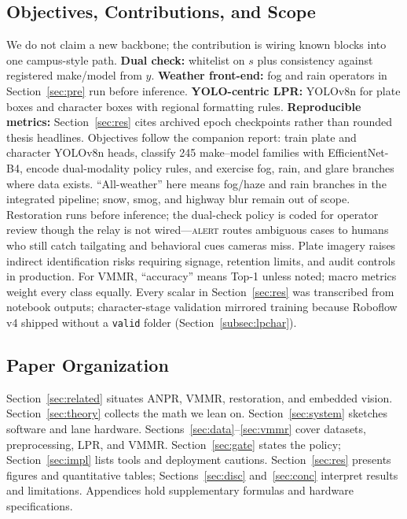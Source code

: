 \documentclass[10pt, conference]{IEEEtran}
\begin{document}
\subsection{Objectives, Contributions, and Scope}
We do not claim a new backbone; the contribution is wiring known blocks into one campus-style path. \textbf{Dual check:} whitelist on $s$ plus consistency against registered make/model from $y$. \textbf{Weather front-end:} fog and rain operators in Section~\ref{sec:pre} run before inference. \textbf{YOLO-centric LPR:} YOLOv8n for plate boxes and character boxes with regional formatting rules. \textbf{Reproducible metrics:} Section~\ref{sec:res} cites archived epoch checkpoints rather than rounded thesis headlines. Objectives follow the companion report: train plate and character YOLOv8n heads, classify 245 make--model families with EfficientNet-B4, encode dual-modality policy rules, and exercise fog, rain, and glare branches where data exists. ``All-weather'' here means fog/haze and rain branches in the integrated pipeline; snow, smog, and highway blur remain out of scope. Restoration runs before inference; the dual-check policy is coded for operator review though the relay is not wired---\textsc{alert} routes ambiguous cases to humans who still catch tailgating and behavioral cues cameras miss. Plate imagery raises indirect identification risks requiring signage, retention limits, and audit controls in production. For VMMR, ``accuracy'' means Top-1 unless noted; macro metrics weight every class equally. Every scalar in Section~\ref{sec:res} was transcribed from notebook outputs; character-stage validation mirrored training because Roboflow v4 shipped without a \texttt{valid} folder (Section~\ref{subsec:lpchar}).

\subsection{Paper Organization}
Section~\ref{sec:related} situates ANPR, VMMR, restoration, and embedded vision. Section~\ref{sec:theory} collects the math we lean on. Section~\ref{sec:system} sketches software and lane hardware. Sections~\ref{sec:data}--\ref{sec:vmmr} cover datasets, preprocessing, LPR, and VMMR. Section~\ref{sec:gate} states the policy; Section~\ref{sec:impl} lists tools and deployment cautions. Section~\ref{sec:res} presents figures and quantitative tables; Sections~\ref{sec:disc} and~\ref{sec:conc} interpret results and limitations. Appendices hold supplementary formulas and hardware specifications.
\end{document}

